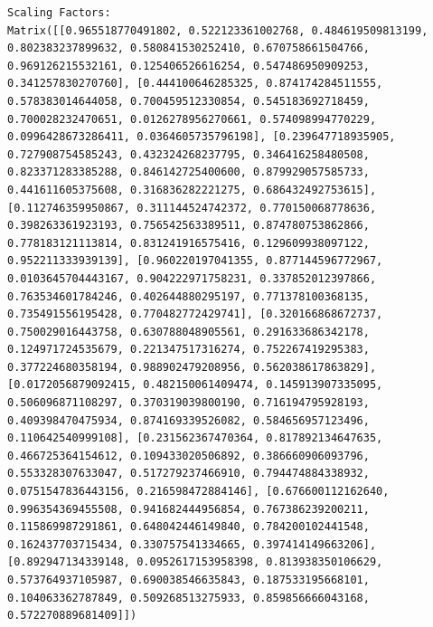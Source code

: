 \documentclass[
  letterpaper,
  DIV=11,
  numbers=noendperiod]{scrreprt}
\theoremstyle{plain}
\theoremstyle{definition}
\theoremstyle{remark}
\begin{document}
\begin{verbatim}
Scaling Factors:
Matrix([[0.965518770491802, 0.522123361002768, 0.484619509813199, 0.802383237899632, 0.580841530252410, 0.670758661504766, 0.969126215532161, 0.125406526616254, 0.547486950909253, 0.341257830270760], [0.444100646285325, 0.874174284511555, 0.578383014644058, 0.700459512330854, 0.545183692718459, 0.700028232470651, 0.0126278956270661, 0.574098994770229, 0.0996428673286411, 0.0364605735796198], [0.239647718935905, 0.727908754585243, 0.432324268237795, 0.346416258480508, 0.823371283385288, 0.846142725400600, 0.879929057585733, 0.441611605375608, 0.316836282221275, 0.686432492753615], [0.112746359950867, 0.311144524742372, 0.770150068778636, 0.398263361923193, 0.756542563389511, 0.874780753862866, 0.778183121113814, 0.831241916575416, 0.129609938097122, 0.952211333939139], [0.960220197041355, 0.877144596772967, 0.0103645704443167, 0.904222971758231, 0.337852012397866, 0.763534601784246, 0.402644880295197, 0.771378100368135, 0.735491556195428, 0.770482772429741], [0.320166868672737, 0.750029016443758, 0.630788048905561, 0.291633686342178, 0.124971724535679, 0.221347517316274, 0.752267419295383, 0.377224680358194, 0.988902479208956, 0.562038617863829], [0.0172056879092415, 0.482150061409474, 0.145913907335095, 0.506096871108297, 0.370319039800190, 0.716194795928193, 0.409398470475934, 0.874169339526082, 0.584656957123496, 0.110642540999108], [0.231562367470364, 0.817892134647635, 0.466725364154612, 0.109433020506892, 0.386660906093796, 0.553328307633047, 0.517279237466910, 0.794474884338932, 0.0751547836443156, 0.216598472884146], [0.676600112162640, 0.996354369455508, 0.941682444956854, 0.767386239200211, 0.115869987291861, 0.648042446149840, 0.784200102441548, 0.162437703715434, 0.330757541334665, 0.397414149663206], [0.892947134339148, 0.0952617153958398, 0.813938350106629, 0.573764937105987, 0.690038546635843, 0.187533195668101, 0.104063362787849, 0.509268513275933, 0.859856666043168, 0.572270889681409]])


\end{verbatim}
\end{document}
